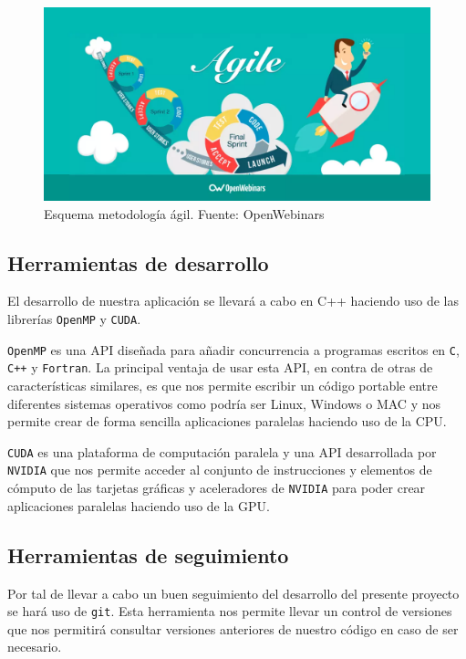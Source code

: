 \documentclass[titlepage,12pt]{report}
\begin{document}
\begin{figure}[ht]
	\centering
	\includegraphics[scale=0.25]{media/agile.png}
	\caption{Esquema metodología ágil. Fuente: OpenWebinars}
	\label{agile}
\end{figure}

\subsection{Herramientas de desarrollo}

El desarrollo de nuestra aplicación se llevará a cabo en C++ haciendo uso de las librerías \texttt{OpenMP} y \texttt{CUDA}. 

\texttt{OpenMP} es una API diseñada para añadir concurrencia a programas escritos en \texttt{C}, \texttt{C++} y \texttt{Fortran}. La principal ventaja de usar esta API, en contra de otras de características similares, es que nos permite escribir un código portable entre diferentes sistemas operativos como podría ser Linux, Windows o MAC y nos permite crear de forma sencilla aplicaciones paralelas haciendo uso de la CPU.

\texttt{CUDA} es una plataforma de computación paralela y una API desarrollada por \texttt{NVIDIA} que nos permite acceder al conjunto de instrucciones y elementos de cómputo de las tarjetas gráficas y aceleradores de \texttt{NVIDIA} para poder crear aplicaciones paralelas haciendo uso de la GPU.

\subsection{Herramientas de seguimiento}

Por tal de llevar a cabo un buen seguimiento del desarrollo del presente proyecto se hará uso de \texttt{git}. Esta herramienta nos permite llevar un control de versiones que nos permitirá consultar versiones anteriores de nuestro código en caso de ser necesario.
\end{document}
